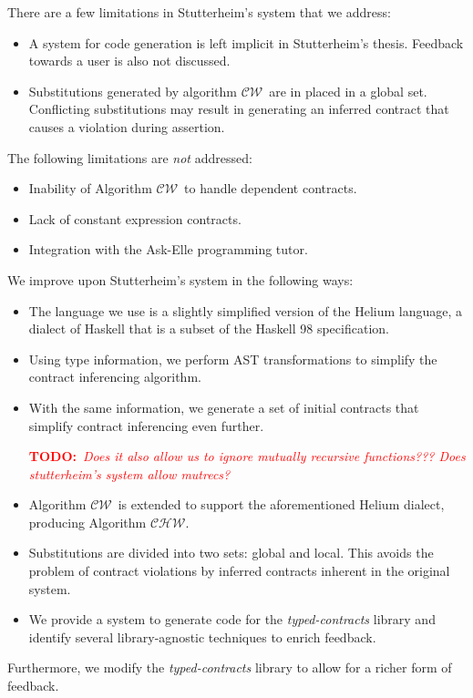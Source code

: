 \documentclass[10pt]{report}
\newcommand{\CW}{$\mathcal{CW}$}
\newcommand{\CHW}{$\mathcal{CHW}$}
\newcommand{\annotate}[3]{
	\begin{scriptsize}
	\textcolor{#1}{\textbf{#2}~\textit{#3}}
	\end{scriptsize}\newline}
\newcommand{\todo}[1]{\annotate{red} {TODO:} {#1}}
\begin{document}
There are a few limitations in Stutterheim's system that we address:

\begin{itemize}
	\item A system for code generation is left implicit in Stutterheim's thesis. Feedback towards a user is also not discussed.
	\item Substitutions generated by algorithm \CW ~are in placed in a global set. Conflicting substitutions may result in generating an inferred contract that causes a violation during assertion.
\end{itemize}

The following limitations are \textit{not} addressed:

\begin{itemize}
	\item Inability of Algorithm \CW ~to handle dependent contracts.
	\item Lack of constant expression contracts.
	\item Integration with the Ask-Elle programming tutor.
\end{itemize}

We improve upon Stutterheim's system in the following ways:
\begin{itemize}
	\item The language we use is a slightly simplified version of the Helium language, a dialect of Haskell that is a subset of the Haskell 98 specification.
	\item Using type information, we perform AST transformations to simplify the contract inferencing algorithm.
	\item With the same information, we generate a set of initial contracts that simplify contract inferencing even further. \todo{Does it also allow us to ignore mutually recursive functions??? Does stutterheim's system allow mutrecs?}
	\item Algorithm \CW ~is extended to support the aforementioned Helium dialect, producing Algorithm \CHW.
	\item Substitutions are divided into two sets: global and local. This avoids the problem of contract violations by inferred contracts inherent in the original system.
	\item We provide a system to generate code for the \textit{typed-contracts} library and identify several library-agnostic techniques to enrich feedback.
\end{itemize}

Furthermore, we modify the \textit{typed-contracts} library to allow for a richer form of feedback.
\end{document}
